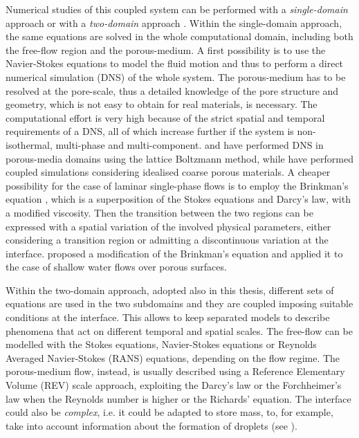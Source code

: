 Numerical studies of this coupled system can be performed with a 
\emph{single-domain} approach or with a \emph{two-domain} approach 
\cite{tesi:fetzer}.
Within the single-domain approach, the same equations are solved in the whole 
computational domain, including both the free-flow region and the 
porous-medium. A first possibility is to use the Navier-Stokes equations to model the 
fluid motion and thus to perform a direct numerical simulation (DNS) of the 
whole system. The porous-medium has to be resolved at the pore-scale, thus a 
detailed knowledge of the pore structure and geometry, which is not easy to obtain for real 
materials, is necessary. The computational effort is very high because 
of the strict spatial and temporal requirements of a DNS,
all of which increase further if the system
is non-isothermal, multi-phase and multi-component. \textcite{intro:dns} and \textcite{intro:dns2} have performed DNS in 
porous-media domains using the lattice Boltzmann method, while \textcite{intro:yang} have performed coupled simulations considering idealised coarse porous materials.
A cheaper possibility for the case of laminar single-phase flows is to employ the Brinkman's equation 
\cite{intro:brinkman}, which is a superposition of the Stokes equations and 
Darcy's law, with a modified viscosity. %
Then the transition between the two 
regions can be expressed with a spatial variation of the involved physical 
parameters, either considering a transition region or admitting a discontinuous 
variation at the interface. \textcite{intro:shavit} proposed a modification of 
the Brinkman's equation and applied it to the case of shallow water flows over 
porous surfaces.

Within the two-domain approach, adopted also in this thesis, different sets of 
equations are used in the two subdomains and they are coupled imposing suitable 
conditions at the interface. This allows to keep separated models to describe phenomena that act on different temporal and spatial scales. The free-flow can be modelled with the Stokes 
equations, Navier-Stokes equations or Reynolds Averaged Navier-Stokes (RANS) equations, depending on the flow 
regime. The porous-medium flow, instead, is usually described using a Reference Elementary Volume (REV) scale approach, exploiting the 
Darcy's law or the Forchheimer's law when the Reynolds number is higher or the 
Richards' equation. The interface could also be \emph{complex}, i.e. it could be 
adapted to store mass, to, for example, take into account information about the formation of droplets
(see \cite{tesi:baber}).

